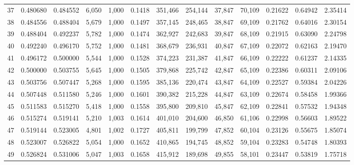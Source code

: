 \begin{tabular}{rrrrrrrrrrrrr}
37  &  0.480680 &  0.484552 &   6,050 &  1,000 &                                     0.1418 &  351,466 &  254,144 &   37,847 &   70,109 &  0.21622 &  0.64942 &  2.35414 \\
38  &  0.484556 &  0.488404 &   5,679 &  1,000 &                                     0.1497 &  357,145 &  248,465 &   38,847 &   69,109 &  0.21762 &  0.64016 &  2.30154 \\
39  &  0.488404 &  0.492237 &   5,782 &  1,000 &                                     0.1474 &  362,927 &  242,683 &   39,847 &   68,109 &  0.21915 &  0.63090 &  2.24798 \\
40  &  0.492240 &  0.496170 &   5,752 &  1,000 &                                     0.1481 &  368,679 &  236,931 &   40,847 &   67,109 &  0.22072 &  0.62163 &  2.19470 \\
41  &  0.496172 &  0.500000 &   5,544 &  1,000 &                                     0.1528 &  374,223 &  231,387 &   41,847 &   66,109 &  0.22222 &  0.61237 &  2.14335 \\
42  &  0.500000 &  0.503755 &   5,645 &  1,000 &                                     0.1505 &  379,868 &  225,742 &   42,847 &   65,109 &  0.22386 &  0.60311 &  2.09106 \\
43  &  0.503756 &  0.507447 &   5,268 &  1,000 &                                     0.1595 &  385,136 &  220,474 &   43,847 &   64,109 &  0.22527 &  0.59384 &  2.04226 \\
44  &  0.507448 &  0.511580 &   5,246 &  1,000 &                                     0.1601 &  390,382 &  215,228 &   44,847 &   63,109 &  0.22674 &  0.58458 &  1.99366 \\
45  &  0.511583 &  0.515270 &   5,418 &  1,000 &                                     0.1558 &  395,800 &  209,810 &   45,847 &   62,109 &  0.22841 &  0.57532 &  1.94348 \\
46  &  0.515274 &  0.519141 &   5,210 &  1,003 &                                     0.1614 &  401,010 &  204,600 &   46,850 &   61,106 &  0.22998 &  0.56603 &  1.89522 \\
47  &  0.519144 &  0.523005 &   4,801 &  1,002 &                                     0.1727 &  405,811 &  199,799 &   47,852 &   60,104 &  0.23126 &  0.55675 &  1.85074 \\
48  &  0.523007 &  0.526822 &   5,054 &  1,000 &                                     0.1652 &  410,865 &  194,745 &   48,852 &   59,104 &  0.23283 &  0.54748 &  1.80393 \\
49  &  0.526824 &  0.531006 &   5,047 &  1,003 &                                     0.1658 &  415,912 &  189,698 &   49,855 &   58,101 &  0.23447 &  0.53819 &  1.75718 \\

\end{tabular}
